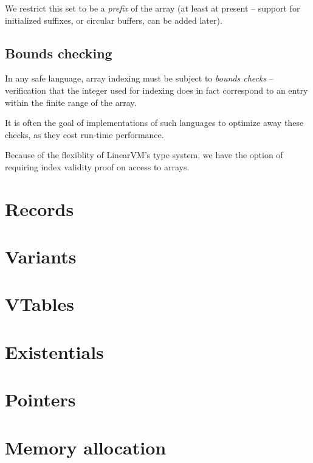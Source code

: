 \documentclass[a4paper]{book}
\begin{document}
We restrict this set to be a \emph{prefix} of the array (at least at
present -- support for initialized suffixes, or circular buffers, can
be added later).

\section{Bounds checking}
In any safe language, array indexing must be subject to \emph{bounds checks}
-- verification that the integer used for indexing does in fact correspond to
an entry within the finite range of the array.

It is often the goal of implementations of such languages to optimize
away these checks, as they cost run-time performance.

Because of the flexiblity of LinearVM's type system, we have the option
of requiring index validity proof on access to arrays.


\chapter{Records}

\chapter{Variants}
\chapter{VTables}
\chapter{Existentials}

\chapter{Pointers}

\chapter{Memory allocation}
\end{document}
